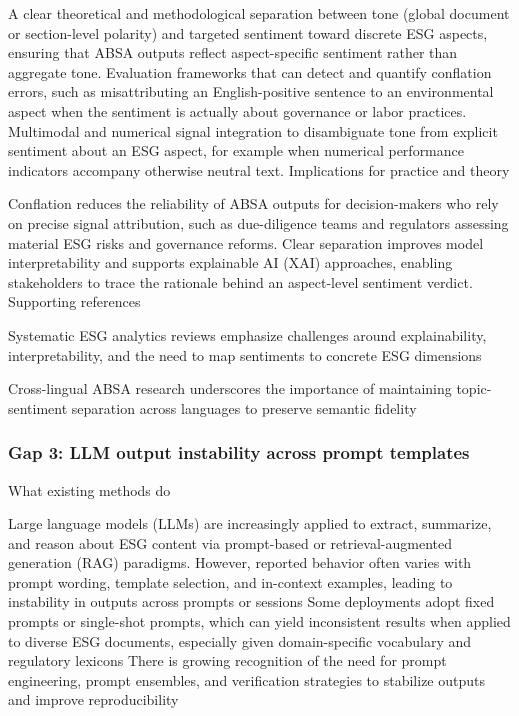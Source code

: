A clear theoretical and methodological separation between tone (global document or section-level polarity) and targeted sentiment toward discrete ESG aspects, ensuring that ABSA outputs reflect aspect-specific sentiment rather than aggregate tone.
Evaluation frameworks that can detect and quantify conflation errors, such as misattributing an English-positive sentence to an environmental aspect when the sentiment is actually about governance or labor practices.
Multimodal and numerical signal integration to disambiguate tone from explicit sentiment about an ESG aspect, for example when numerical performance indicators accompany otherwise neutral text.
Implications for practice and theory

Conflation reduces the reliability of ABSA outputs for decision-makers who rely on precise signal attribution, such as due-diligence teams and regulators assessing material ESG risks and governance reforms.
Clear separation improves model interpretability and supports explainable AI (XAI) approaches, enabling stakeholders to trace the rationale behind an aspect-level sentiment verdict.
Supporting references

Systematic ESG analytics reviews emphasize challenges around explainability, interpretability, and the need to map sentiments to concrete ESG dimensions \cite{10.1002/csr.70089,10.2139/ssrn.3738629,10.1108/mf-01-2023-0020}

Cross-lingual ABSA research underscores the importance of maintaining topic-sentiment separation across languages to preserve semantic fidelity \cite{10.1016/j.inffus.2025.103073,10.1111/eufm.12509,10.48550/arxiv.2511.00024}

\subsubsection{Gap 3: LLM output instability across prompt templates}
What existing methods do

Large language models (LLMs) are increasingly applied to extract, summarize, and reason about ESG content via prompt-based or retrieval-augmented generation (RAG) paradigms. However, reported behavior often varies with prompt wording, template selection, and in-context examples, leading to instability in outputs across prompts or sessions \cite{10.1609/aaai.v38i21.30574,10.48550/arxiv.2511.14210}
Some deployments adopt fixed prompts or single-shot prompts, which can yield inconsistent results when applied to diverse ESG documents, especially given domain-specific vocabulary and regulatory lexicons \cite{10.1609/aaai.v38i21.30574,10.48550/arxiv.2511.14210}
There is growing recognition of the need for prompt engineering, prompt ensembles, and verification strategies to stabilize outputs and improve reproducibility \cite{10.1609/aaai.v38i21.30574,10.48550/arxiv.2511.14210}

